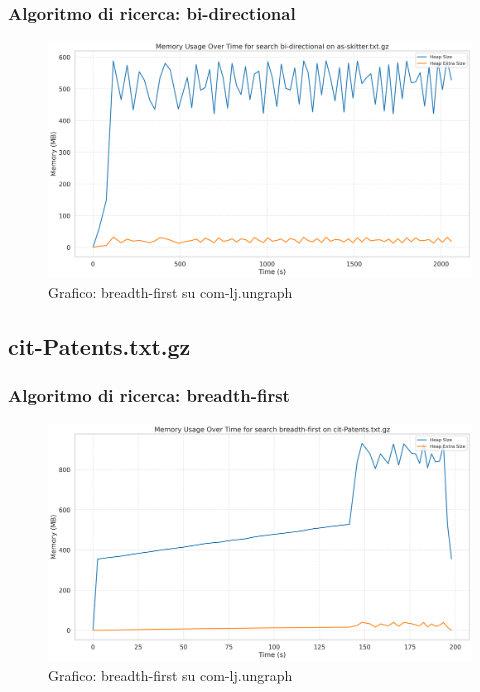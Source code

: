 \documentclass{article}
\begin{document}
\subsubsection{Algoritmo di ricerca: bi-directional}
\begin{figure}[htbp]\centering
\includegraphics[width=\textwidth]{../plots/as-skitter_bi-directional.png}
\caption{Grafico: breadth-first su com-lj.ungraph}
\end{figure}
\subsection{cit-Patents.txt.gz}
\subsubsection{Algoritmo di ricerca: breadth-first}
\begin{figure}[htbp]\centering
\includegraphics[width=\textwidth]{../plots/cit-Patents_breadth-first.png}
\caption{Grafico: breadth-first su com-lj.ungraph}
\end{figure}
\end{document}
